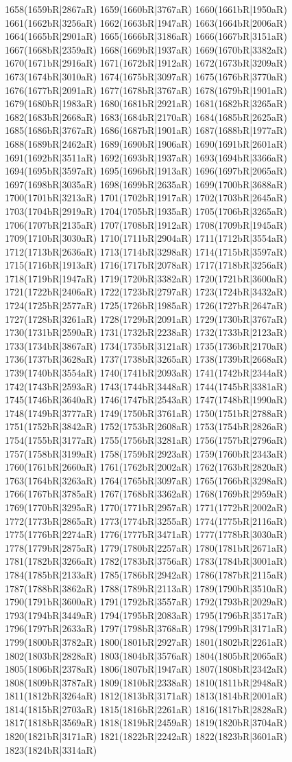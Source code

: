 1658(1659bR|2867aR) 1659(1660bR|3767aR) 1660(1661bR|1950aR) 1661(1662bR|3256aR) 1662(1663bR|1947aR) 1663(1664bR|2006aR) 1664(1665bR|2901aR) 1665(1666bR|3186aR) 1666(1667bR|3151aR) 1667(1668bR|2359aR) 1668(1669bR|1937aR) 1669(1670bR|3382aR) 1670(1671bR|2916aR) 1671(1672bR|1912aR) 1672(1673bR|3209aR) 1673(1674bR|3010aR) 1674(1675bR|3097aR) 1675(1676bR|3770aR) 1676(1677bR|2091aR) 1677(1678bR|3767aR) 1678(1679bR|1901aR) 1679(1680bR|1983aR) 1680(1681bR|2921aR) 1681(1682bR|3265aR) 1682(1683bR|2668aR) 1683(1684bR|2170aR) 1684(1685bR|2625aR) 1685(1686bR|3767aR) 1686(1687bR|1901aR) 1687(1688bR|1977aR) 1688(1689bR|2462aR) 1689(1690bR|1906aR) 1690(1691bR|2601aR) 1691(1692bR|3511aR) 1692(1693bR|1937aR) 1693(1694bR|3366aR) 1694(1695bR|3597aR) 1695(1696bR|1913aR) 1696(1697bR|2065aR) 1697(1698bR|3035aR) 1698(1699bR|2635aR) 1699(1700bR|3688aR) 1700(1701bR|3213aR) 1701(1702bR|1917aR) 1702(1703bR|2645aR) 1703(1704bR|2919aR) 1704(1705bR|1935aR) 1705(1706bR|3265aR) 1706(1707bR|2135aR) 1707(1708bR|1912aR) 1708(1709bR|1945aR) 1709(1710bR|3030aR) 1710(1711bR|2904aR) 1711(1712bR|3554aR) 1712(1713bR|2636aR) 1713(1714bR|3298aR) 1714(1715bR|3597aR) 1715(1716bR|1913aR) 1716(1717bR|2078aR) 1717(1718bR|3256aR) 1718(1719bR|1947aR) 1719(1720bR|3382aR) 1720(1721bR|3600aR) 1721(1722bR|2406aR) 1722(1723bR|2797aR) 1723(1724bR|3432aR) 1724(1725bR|2577aR) 1725(1726bR|1985aR) 1726(1727bR|2647aR) 1727(1728bR|3261aR) 1728(1729bR|2091aR) 1729(1730bR|3767aR) 1730(1731bR|2590aR) 1731(1732bR|2238aR) 1732(1733bR|2123aR) 1733(1734bR|3867aR) 1734(1735bR|3121aR) 1735(1736bR|2170aR) 1736(1737bR|3628aR) 1737(1738bR|3265aR) 1738(1739bR|2668aR) 1739(1740bR|3554aR) 1740(1741bR|2093aR) 1741(1742bR|2344aR) 1742(1743bR|2593aR) 1743(1744bR|3448aR) 1744(1745bR|3381aR) 1745(1746bR|3640aR) 1746(1747bR|2543aR) 1747(1748bR|1990aR) 1748(1749bR|3777aR) 1749(1750bR|3761aR) 1750(1751bR|2788aR) 1751(1752bR|3842aR) 1752(1753bR|2608aR) 1753(1754bR|2826aR) 1754(1755bR|3177aR) 1755(1756bR|3281aR) 1756(1757bR|2796aR) 1757(1758bR|3199aR) 1758(1759bR|2923aR) 1759(1760bR|2343aR) 1760(1761bR|2660aR) 1761(1762bR|2002aR) 1762(1763bR|2820aR) 1763(1764bR|3263aR) 1764(1765bR|3097aR) 1765(1766bR|3298aR) 1766(1767bR|3785aR) 1767(1768bR|3362aR) 1768(1769bR|2959aR) 1769(1770bR|3295aR) 1770(1771bR|2957aR) 1771(1772bR|2002aR) 1772(1773bR|2865aR) 1773(1774bR|3255aR) 1774(1775bR|2116aR) 1775(1776bR|2274aR) 1776(1777bR|3471aR) 1777(1778bR|3030aR) 1778(1779bR|2875aR) 1779(1780bR|2257aR) 1780(1781bR|2671aR) 1781(1782bR|3266aR) 1782(1783bR|3756aR) 1783(1784bR|3001aR) 1784(1785bR|2133aR) 1785(1786bR|2942aR) 1786(1787bR|2115aR) 1787(1788bR|3862aR) 1788(1789bR|2113aR) 1789(1790bR|3510aR) 1790(1791bR|3600aR) 1791(1792bR|3557aR) 1792(1793bR|2029aR) 1793(1794bR|3449aR) 1794(1795bR|2083aR) 1795(1796bR|3517aR) 1796(1797bR|2633aR) 1797(1798bR|3768aR) 1798(1799bR|3171aR) 1799(1800bR|3782aR) 1800(1801bR|2927aR) 1801(1802bR|2261aR) 1802(1803bR|2828aR) 1803(1804bR|3576aR) 1804(1805bR|2065aR) 1805(1806bR|2378aR) 1806(1807bR|1947aR) 1807(1808bR|2342aR) 1808(1809bR|3787aR) 1809(1810bR|2338aR) 1810(1811bR|2948aR) 1811(1812bR|3264aR) 1812(1813bR|3171aR) 1813(1814bR|2001aR) 1814(1815bR|2703aR) 1815(1816bR|2261aR) 1816(1817bR|2828aR) 1817(1818bR|3569aR) 1818(1819bR|2459aR) 1819(1820bR|3704aR) 1820(1821bR|3171aR) 1821(1822bR|2242aR) 1822(1823bR|3601aR) 1823(1824bR|3314aR) 